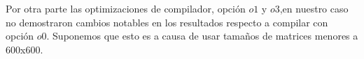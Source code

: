\par Por otra parte las optimizaciones de compilador, opción $o1$ y $o3$,en nuestro caso no demostraron cambios notables en los resultados respecto a compilar con opción $o0$. Suponemos que esto es a causa de usar tamaños de matrices menores a 600x600.

 
